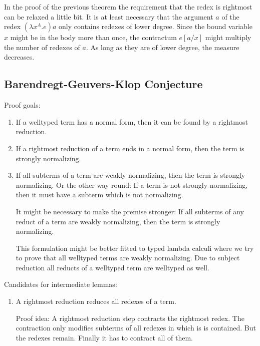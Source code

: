 \begin{remark}
    In the proof of the previous theorem the requirement that the redex is
    rightmost can be relaxed a little bit. It is at least necessary that
    the argument $a$ of the redex $(\lambda x^A.e) a$ only contains
    redexes of lower degree. Since the bound variable $x$ might be in the
    body more than once, the contractum $e[a/x]$ might multiply the number of
    redexes of $a$. As long as they are of lower degree, the measure decreases.
\end{remark}







\subsection{Barendregt-Geuvers-Klop Conjecture}

Proof goals:
\begin{enumerate}
    \item If a welltyped term has a normal form, then it can be found
        by a rightmost reduction.

    \item If a rightmost reduction of a term ends in a normal form, then
        the term is strongly normalizing.

    \item  If all subterms of a term are weakly normalizing, then the term
        is strongly normalizing. Or the other way round: If a term is not
        strongly normalizing, then it must have a subterm which is not
        normalizing.

        It might be necessary to make the premise stronger: If all subterms of
        any reduct of a term are weakly normalizing, then the term is strongly
        normalizing.

        This formulation might be better fitted to typed lambda calculi
        where we try to prove that all welltyped terms are weakly normalizing.
        Due to subject reduction all reducts of a welltyped term are welltyped
        as well.
\end{enumerate}

Candidates for intermediate lemmas:
\begin{enumerate}
    \item A rightmost reduction reduces all redexes of a term.

        Proof idea: A rightmost reduction step contracts the rightmost redex.
        The contraction only modifies subterms of all redexes
        in which is is contained. But the redexes remain. Finally it has to
        contract all of them.
\end{enumerate}


